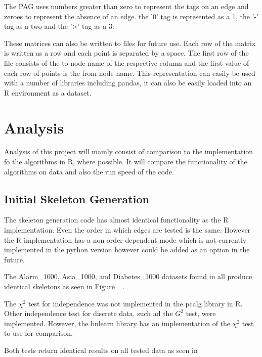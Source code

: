 \documentclass{UoYCSproject}
\begin{document}
The PAG uses numbers greater than zero to represent the tags on an edge and zeroes to represent the absence of an edge. the '0' tag is represented as a 1, the '-' tag as a two and the '>' tag as a 3.

These matrices can also be written to files for future use. Each row of the matrix is written as a row and each point is separated by a space. The first row of the file consists of the to node name of the respective column and the first value of each row of points is the from node name. This representation can easily be used with a number of libraries including pandas, it can also be easily loaded into an R environment as a dataset.
\chapter{Analysis}
Analysis of this project will mainly consist of comparison to the implementation fo the algorithms in R, where possible. It will compare the functionality of the algorithms on data and also the run speed of the code.

\section{Initial Skeleton Generation}
The skeleton generation code has almost identical functionality as the R implementation. Even the order in which edges are tested is the same. However the R implementation has a non-order dependent mode which is not currently implemented in the python version however could be added as an option in the future.

The Alarm\_1000, Asia\_1000, and Diabetes\_1000 datasets found in  all produce identical skeletons as seen in Figure \_.

The $\chi^2$ test for independence was not implemented in the pcalg library in R. Other independence test for discrete data, such ad the $G^2$ test, were implemented. However, the bnlearn library has an implementation of the $\chi^2$ test to use for comparison.

Both tests return identical results on all tested data as seen in
\end{document}
